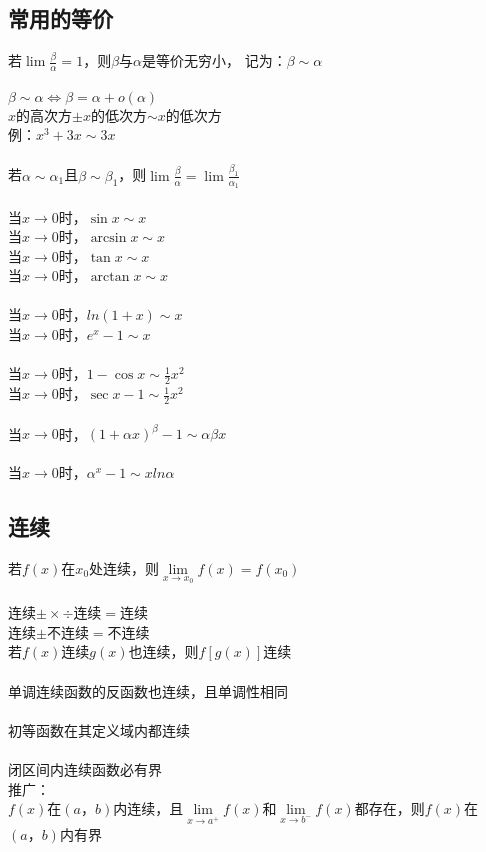\documentclass{article}
\begin{document}
\begin{flushleft}
	\subsection{常用的等价}
	
	若$\lim \frac{\beta}{\alpha}=1$，则$\beta$与$\alpha$是等价无穷小，
	记为：$\beta \sim \alpha$\\
	~\\
	$\beta \sim \alpha \Leftrightarrow \beta = \alpha + o(\alpha)$\\
	$x$的高次方$\pm x$的低次方$\sim x$的低次方\\
	\qquad 例：$x^3+3x\sim 3x$\\
	~\\
	若$\alpha \sim \alpha_1$且$\beta \sim \beta_1$，则$\lim \frac{\beta}{\alpha} = \lim \frac{\beta_1}{\alpha_1}$\\
	~\\
	当$x\to 0$时，$\sin x \sim x$\\
	当$x\to 0$时，$\arcsin x \sim x$\\
	当$x\to 0$时，$\tan x \sim x$\\
	当$x\to 0$时，$\arctan x \sim x$\\
	~\\
	当$x\to 0$时，$ln(1+x) \sim x$\\
	当$x\to 0$时，$e^x-1 \sim x$\\
	~\\
	当$x\to 0$时，$1-\cos x \sim \frac{1}{2} x^2$\\
	当$x\to 0$时，$\sec x - 1 \sim \frac{1}{2} x^2$\\
	~\\
	当$x\to 0$时，$(1+\alpha x)^\beta -1 \sim \alpha\beta x$\\
	~\\
	当$x\to 0$时，$\alpha^x -1 \sim xln\alpha$\\
	
	\subsection{连续}
	
	若$f(x)$在$x_0$处连续，则$\lim\limits_{x\to x_0} f(x)=f(x_0)$\\
	~\\
	连续$\pm\times\div$连续$=$连续\\
	连续$\pm$不连续$=$不连续\\
	若$f(x)$连续$g(x)$也连续，则$f[g(x)]$连续\\
	~\\
	单调连续函数的反函数也连续，且单调性相同\\
	~\\
	初等函数在其定义域内都连续\\
	~\\
	闭区间内连续函数必有界\\
	推广：\\
	$f(x)$在$(a，b)$内连续，且$\lim\limits_{x\to a^+} f(x)$和$\lim\limits_{x\to b^-} f(x)$都存在，则$f(x)$在$(a，b)$内有界\\
	~\\

\end{flushleft}
\end{document}
